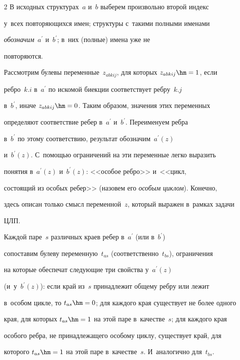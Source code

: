 \begin{multicols}{2}
  В исходных структурах~$a$ и~$b$ выберем произвольно второй индекс 


у~всех повторяющихся имен; структуры с~такими полными именами 


\textit{обозначим}~$a^\prime$ и~$b^\prime$; в~них (полные) имена уже не 


повторяются.


  


  Рассмотрим булевы переменные~$z_{abkij}$, для которых $z_{abkij}\hm=1$, если 


ребро~$k.i$ в~$a^\prime$ по искомой биекции соответствует ребру~$k.j$ 


в~$b^\prime$, иначе $z_{abkij}\hm=0$. Таким образом, значения этих переменных 


определяют соответствие ребер в~$a^\prime$ и~$b^\prime$. Переименуем реб\-ра 


в~$b^\prime$ по этому соответствию, результат обозначим~$a^\prime(z)$ 


и~$b^\prime(z)$. С~по\-мощью ограничений на эти переменные легко выразить 


понятия в~$a^\prime(z)$ и~$b^\prime(z)$: <<особое ребро>> и~<<цикл, 


состоящий из особых ребер>> (назовем его \textit{особым циклом}). Конечно, 


здесь описан только смысл переменной~$z$, который выражен в~рамках задачи 


ЦЛП.


  


  Каждой паре~$s$ различных краев ребер в~$a^\prime$ (или в~$b^\prime$) 


сопоставим булеву переменную~$t_{as}$ (соответственно~$t_{bs}$), ограничения 


на которые обеспечат следующие три свойства у~$a^\prime(z)$ 


(и~у~$b^\prime(z)$): если край из~$s$ принадлежит общему ребру или лежит 


в~особом цикле, то $t_{as}\hm=0$; для каждого края существует не более одного 


края, для которых $t_{as}\hm=1$ на этой паре в~качестве~$s$; для каждого края 


особого реб\-ра, не принадлежащего особому циклу, существует край, для 


которого $t_{as}\hm=1$ на этой паре в~качестве~$s$. И~аналогично для~$t_{bs}$. 



\end{multicols}
